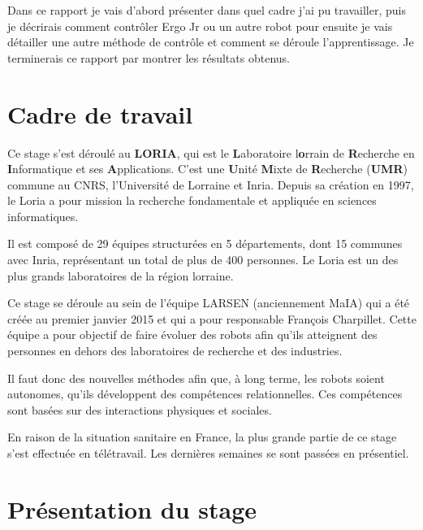 \documentclass[11pt,french]{report}
\begin{document}
Dans ce rapport je vais d'abord présenter dans quel cadre j'ai pu travailler, puis je décrirais comment contrôler Ergo Jr ou un autre robot pour ensuite je vais détailler une autre méthode de contrôle et comment se déroule l'apprentissage.
Je terminerais ce rapport par montrer les résultats obtenus.

\chapter{Cadre de travail}

Ce stage s'est déroulé au \textbf{LORIA}, qui est le \textbf{L}aboratoire l\textbf{o}rrain de \textbf{R}echerche en \textbf{I}nformatique et ses \textbf{A}pplications.
C'est une \textbf{U}nité \textbf{M}ixte de \textbf{R}echerche (\textbf{UMR}) commune au CNRS, l'Université de Lorraine et Inria.
Depuis sa création en 1997, le Loria a pour mission la recherche fondamentale et appliquée en sciences informatiques.

Il est composé de 29 équipes structurées en 5 départements, dont 15 communes avec Inria, représentant un total de plus de 400 personnes.
Le Loria est un des plus grands laboratoires de la région lorraine.

\phantom{INVISIBLE LINE}

Ce stage se déroule au sein de l’équipe LARSEN (anciennement MaIA) qui a été créée au premier janvier 2015 et qui a pour responsable François Charpillet.
Cette équipe a pour objectif de faire évoluer des robots afin qu'ils atteignent des personnes en dehors des laboratoires de recherche et des industries.

Il faut donc des nouvelles méthodes afin que, à long terme, les robots soient autonomes, qu'ils développent des compétences relationnelles.
Ces compétences sont basées sur des interactions physiques et sociales.

\phantom{INVISIBLE LINE}

En raison de la situation sanitaire en France, la plus grande partie de ce stage s'est effectuée en télétravail. Les dernières semaines se sont passées en présentiel.

\chapter{Présentation du stage}
\end{document}

